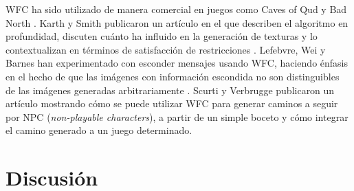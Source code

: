 WFC ha sido utilizado de manera comercial en juegos
como Caves of Qud \cite{bib:17} y Bad North \cite{bib:18}.
Karth y Smith publicaron un artículo en el que describen 
el algoritmo en profundidad,
discuten cuánto ha influido en la generación de texturas y lo
contextualizan en términos de satisfacción de restricciones \cite{bib:2}.
Lefebvre, Wei y Barnes han experimentado con esconder mensajes
usando WFC, haciendo énfasis en el hecho de que las imágenes
con información escondida no son distinguibles de las imágenes
generadas arbitrariamente \cite{bib:14}. Scurti y Verbrugge
publicaron un artículo mostrando cómo se puede utilizar
WFC para generar caminos a seguir por NPC (\textit{non-playable characters}),
a partir de un simple boceto y cómo integrar el camino generado a
un juego determinado.


\section{Discusión}

